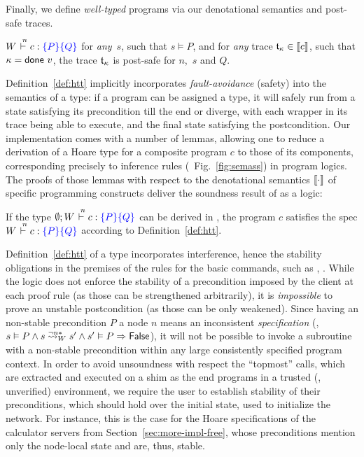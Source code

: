 %
\noindent
%
Finally, we define \emph{well-typed} programs via our denotational
semantics and post-safe traces.
%
\begin{definition}
\label{def:htt}
$W \vd{n} c: \pre{P}\post{Q}$ \Iff for \emph{any}~$s$,
such that $s \vDash P$, and for \emph{any} trace $\mathfrak{t}_{\kappa} \in \llbracket{c}\rrbracket$,
such that $\kappa = \mathsf{done}~v$, the trace $\mathfrak{t}_{\kappa}$ is post-safe for
$n$,~$s$ and $Q$.
\end{definition}
%
%
Definition~\ref{def:htt} implicitly incorporates
\emph{fault-avoidance} (safety) into the semantics of a type: if a
program can be assigned a type, it will safely run from a state
satisfying its precondition till the end or diverge, with each wrapper
in its trace being able to execute, and the final state satisfying the
postcondition.
%
Our implementation comes with a number of lemmas, allowing one to
reduce a derivation of a Hoare type for a composite program $c$ to
those of its components, corresponding precisely to inference rules
(\cf~Fig.~\ref{fig:semass}) in program logics.
%
The proofs of those lemmas with respect to the denotational semantics
$\llbracket{\cdot}\rrbracket$ of specific programming constructs deliver the
soundness result of \disel as a logic:
%
\begin{theorem}
  If the type $\emptyset; W \vd{n} c: \specK{P} \specK{Q}$ can be
  derived in \disel, the program $c$ satisfies the spec
  $W \vd{n} c: \pre{P}\post{Q}$ according to Definition~\ref{def:htt}.
\end{theorem}
%
Definition~\ref{def:htt} of a type incorporates interference, hence
the stability obligations in the premises of the rules for the basic
commands, such as , .
%
While the logic does not enforce the stability of a precondition
imposed by the client at each proof rule (as those can be strengthened
arbitrarily), it is \emph{impossible} to prove an unstable
postcondition (as those can be only weakened). Since having an
non-stable precondition $P$ \wrt a node $n$ means an inconsistent
\emph{specification} (\ie,
$s \vDash P \aand \ninf{W}{n}{s}{s'} \aand s' \vDash P \Rightarrow
\False$),
it will not be possible to invoke a subroutine with a non-stable
precondition within any large consistently specified program context.
%
In order to avoid unsoundness with respect the ``topmost'' calls,
which are extracted and executed on a shim as the end programs in a
trusted (\ie, unverified) environment, we require the user to
establish stability of their preconditions, which should hold over the
initial state, used to initialize the network.
%
For instance, this is the case for the Hoare specifications of the
calculator servers from Section~\ref{sec:more-impl-free}, whose
preconditions mention only the node-local state and are, thus, stable.

